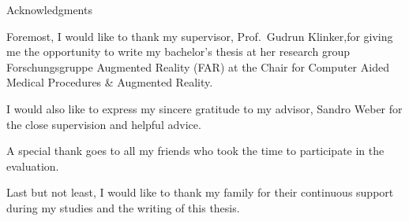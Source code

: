 \clearpage
{}
\thispagestyle{empty}

\vspace*{20mm}

\begin{center}
	{ Acknowledgments}
\end{center}

\vspace{10mm}

Foremost, I would like to thank my supervisor, Prof.\ Gudrun Klinker,for giving me the opportunity to write my bachelor's thesis at her research group Forschungsgruppe Augmented Reality (FAR) at the Chair for Computer Aided Medical Procedures \& Augmented Reality.

I would also like to express my sincere gratitude to my advisor, Sandro Weber for the close supervision and helpful advice.

A special thank goes to all my friends who took the time to participate in the evaluation.

Last but not least, I would like to thank my family for their continuous support during my studies and the writing of this thesis.

\cleardoublepage{}
